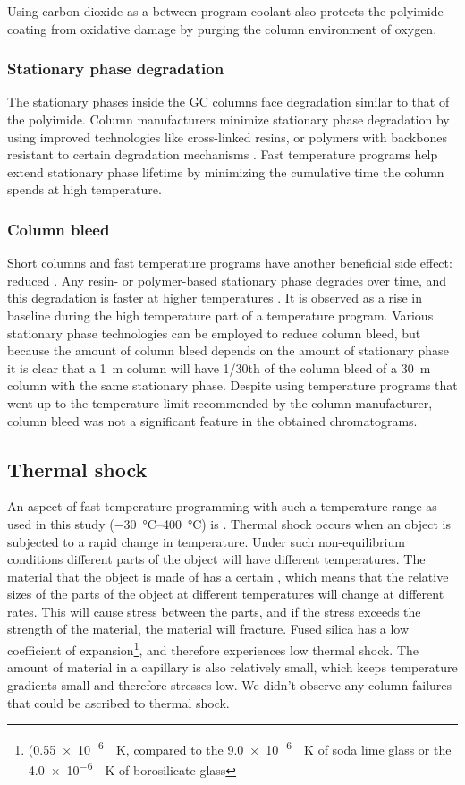 Using carbon dioxide as a between-program coolant also protects the polyimide
coating from oxidative damage by purging the column environment of oxygen.

\subsubsection{Stationary phase degradation}

The stationary phases inside the GC columns face degradation similar to that of
the polyimide. Column manufacturers minimize sta\-tion\-ary phase degradation by
using improved technologies like cross-linked resins, or polymers with backbones
resistant to certain degradation mechanisms \autocite{Day2003}.
Fast temperature programs help extend stationary phase lifetime by minimizing
the cumulative time the column spends at high temperature.

\subsubsection{Column bleed}
Short columns and fast temperature programs have another beneficial side effect:
reduced . Any resin- or polymer-based stationary phase
degrades over time, and this degradation is faster at higher temperatures
\autocite[p. 66]{Mcnair2019}. It is observed as a rise in baseline during the
high temperature part of a temperature program. Various stationary phase
technologies can be employed to reduce column bleed, but because the amount of
column bleed depends on the amount of stationary phase it is clear that a
\SI{1}{\metre} column will have \num{1/30}th of the column bleed of a
\SI{30}{\metre} column with the same stationary phase. Despite using temperature
programs that went up to the temperature limit recommended by the column
manufacturer, column bleed was not a significant feature in the obtained
chromatograms.

\subsection{Thermal shock}
An aspect of fast temperature programming with such a temperature range as used
in this study (\SIrange{-30}{400}{\celsius}) is . Thermal
shock occurs when an object is subjected to a rapid change in temperature. Under
such non-equilibrium conditions different parts of the object will have
different temperatures. The material that the object is made of has a certain
, which means that the relative sizes
of the parts of the object at different temperatures will change at different
rates. This will cause stress between the parts, and if the stress exceeds the
strength of the material, the material will fracture. Fused silica has a low
coefficient of expansion\footnote{ (\SI{0.55e-6}{\per\kelvin}, compared to the
\SI{9.0e-6}{\per\kelvin} of soda lime glass or the \SI{4.0e-6}{\per\kelvin} of
borosilicate glass}, and therefore experiences low thermal shock. The amount of
material in a capillary is also relatively small, which keeps temperature
gradients small and therefore stresses low. We didn't observe any column
failures that could be ascribed to thermal shock.

